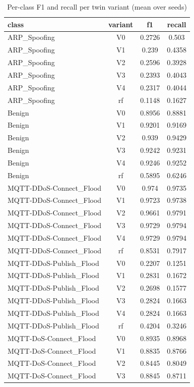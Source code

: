 \begin{table}[htbp]
\centering
\caption{Per-class F1 and recall per twin variant (mean over seeds)}
\label{tab:twin_per_class}
\begin{tabular}{lccc}
\toprule
class & variant & f1 & recall \\
\midrule
ARP\_Spoofing & V0 & 0.2726 & 0.503 \\
ARP\_Spoofing & V1 & 0.239 & 0.4358 \\
ARP\_Spoofing & V2 & 0.2596 & 0.3928 \\
ARP\_Spoofing & V3 & 0.2393 & 0.4043 \\
ARP\_Spoofing & V4 & 0.2317 & 0.4044 \\
ARP\_Spoofing & rf & 0.1148 & 0.1627 \\
Benign & V0 & 0.8956 & 0.8881 \\
Benign & V1 & 0.9201 & 0.9169 \\
Benign & V2 & 0.939 & 0.9429 \\
Benign & V3 & 0.9242 & 0.9231 \\
Benign & V4 & 0.9246 & 0.9252 \\
Benign & rf & 0.5895 & 0.6246 \\
MQTT-DDoS-Connect\_Flood & V0 & 0.974 & 0.9735 \\
MQTT-DDoS-Connect\_Flood & V1 & 0.9723 & 0.9738 \\
MQTT-DDoS-Connect\_Flood & V2 & 0.9661 & 0.9791 \\
MQTT-DDoS-Connect\_Flood & V3 & 0.9729 & 0.9794 \\
MQTT-DDoS-Connect\_Flood & V4 & 0.9729 & 0.9794 \\
MQTT-DDoS-Connect\_Flood & rf & 0.8531 & 0.7917 \\
MQTT-DDoS-Publish\_Flood & V0 & 0.2207 & 0.1251 \\
MQTT-DDoS-Publish\_Flood & V1 & 0.2831 & 0.1672 \\
MQTT-DDoS-Publish\_Flood & V2 & 0.2698 & 0.1577 \\
MQTT-DDoS-Publish\_Flood & V3 & 0.2824 & 0.1663 \\
MQTT-DDoS-Publish\_Flood & V4 & 0.2824 & 0.1663 \\
MQTT-DDoS-Publish\_Flood & rf & 0.4204 & 0.3246 \\
MQTT-DoS-Connect\_Flood & V0 & 0.8935 & 0.8968 \\
MQTT-DoS-Connect\_Flood & V1 & 0.8835 & 0.8766 \\
MQTT-DoS-Connect\_Flood & V2 & 0.8445 & 0.8049 \\
MQTT-DoS-Connect\_Flood & V3 & 0.8845 & 0.8711 \\

\end{tabular}
\end{table}
